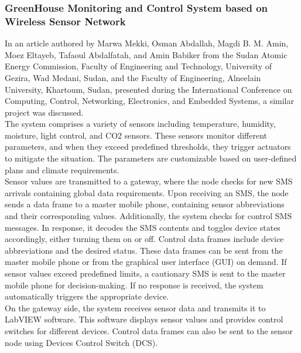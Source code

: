 \documentclass[12pt, a4paper]{article}
\begin{document}
\subsubsection{GreenHouse Monitoring and Control System based on Wireless Sensor Network}
In an article authored by Marwa Mekki, Osman Abdallah, Magdi B. M. Amin, Moez Eltayeb, Tafaoul Abdalfatah, and Amin Babiker \cite{7381396} from the Sudan Atomic Energy Commission, Faculty of Engineering and Technology, University of Gezira, Wad Medani, Sudan, and the Faculty of Engineering, Alneelain University, Khartoum, Sudan, presented during the International Conference on Computing, Control, Networking, Electronics, and Embedded Systems, a similar project was discussed.\\
The system comprises a variety of sensors including temperature, humidity, moisture, light control, and CO2 sensors. These sensors monitor different parameters, and when they exceed predefined thresholds, they trigger actuators to mitigate the situation. The parameters are customizable based on user-defined plans and climate requirements.\\
Sensor values are transmitted to a gateway, where the node checks for new SMS arrivals containing global data requirements. Upon receiving an SMS, the node sends a data frame to a master mobile phone, containing sensor abbreviations and their corresponding values. Additionally, the system checks for control SMS messages. In response, it decodes the SMS contents and toggles device states accordingly, either turning them on or off. Control data frames include device abbreviations and the desired status. These data frames can be sent from the master mobile phone or from the graphical user interface (GUI) on demand. If sensor values exceed predefined limits, a cautionary SMS is sent to the master mobile phone for decision-making. If no response is received, the system automatically triggers the appropriate device.\\
On the gateway side, the system receives sensor data and transmits it to LabVIEW software. This software displays sensor values and provides control switches for different devices. Control data frames can also be sent to the sensor node using Devices Control Switch (DCS).
 
\end{document}
